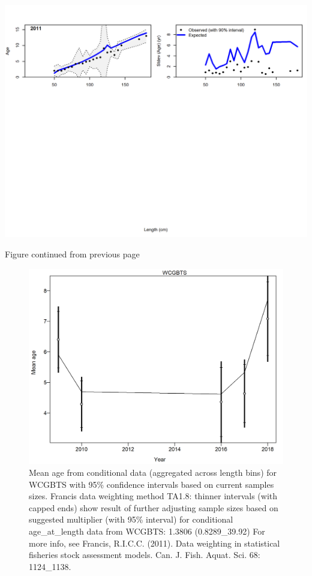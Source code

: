 \documentclass[12pt,]{article}
\begin{document}
\includegraphics{./r4ss/plots_mod1/comp_condAALfit_Andre_plotsflt1mkt2_page2.png}

\begin{center} 

              Figure continued from previous page 

             \end{center}

\begin{figure}
\centering
\includegraphics{./r4ss/plots_mod1/comp_condAALfit_data_weighting_TA1.8_condAgeWCGBTS.png}
\caption{Mean age from conditional data (aggregated across length bins)
for WCGBTS with 95\% confidence intervals based on current samples
sizes. Francis data weighting method TA1.8: thinner intervals (with
capped ends) show result of further adjusting sample sizes based on
suggested multiplier (with 95\% interval) for conditional
age\_at\_length data from WCGBTS: 1.3806 (0.8289\_39.92) For more info,
see Francis, R.I.C.C. (2011). Data weighting in statistical fisheries
stock assessment models. Can. J. Fish. Aquat. Sci. 68: 1124\_1138.
\label{fig:mod1_6_comp_condAALfit_data_weighting_TA1.8_condAgeWCGBTS}}
\end{figure}
\end{document}
